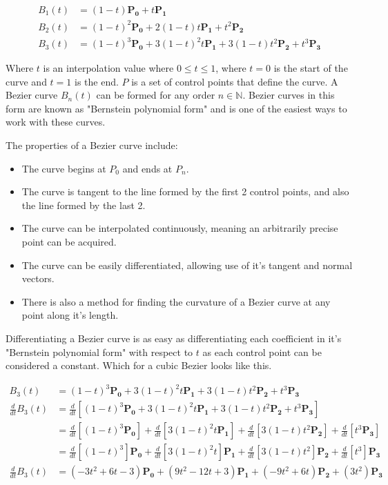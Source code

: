         \begin{align*}
            B_1(t) &= (1 - t)\mathbf{P_0} + t\mathbf{P_1}\\
            B_2(t) &= (1 - t)^2\mathbf{P_0} + 2(1 - t)t\mathbf{P_1} + t^2\mathbf{P_2}\\
            B_3(t) &= (1 - t)^3\mathbf{P_0} + 3(1 - t)^2t\mathbf{P_1} + 3(1 - t)t^2\mathbf{P_2} + t^3\mathbf{P_3}
        \end{align*}

        Where $t$ is an interpolation value where $0 \leq t \leq 1$, where $t=0$ is the start of the curve and $t=1$ is the end. $P$ is a set of control points that define the curve. A Bezier curve $B_n(t)$ can be formed for any order $n \in \mathbb{N}$. Bezier curves in this form are known as "Bernstein polynomial form" and is one of the easiest ways to work with these curves.

        The properties of a Bezier curve include:
        \begin{itemize}
            \item The curve begins at $P_0$ and ends at $P_n$.
            \item The curve is tangent to the line formed by the first 2 control points, and also the line formed by the last 2.
            \item The curve can be interpolated continuously, meaning an arbitrarily precise point can be acquired.
            \item The curve can be easily differentiated, allowing use of it's tangent and normal vectors.
            \item There is also a method for finding the curvature of a Bezier curve at any point along it's length.
        \end{itemize}

        Differentiating a Bezier curve is as easy as differentiating each coefficient in it's "Bernstein polynomial form" with respect to $t$ as each control point can be considered a constant. Which for a cubic Bezier looks like this.

        \begin{align*}
            B_3(t) &= (1 - t)^3\mathbf{P_0} + 3(1 - t)^2t\mathbf{P_1} + 3(1 - t)t^2\mathbf{P_2} + t^3\mathbf{P_3}\\
            \frac{d}{dt}B_3(t) &= \frac{d}{dt}\left[(1 - t)^3\mathbf{P_0} + 3(1 - t)^2t\mathbf{P_1} + 3(1 - t)t^2\mathbf{P_2} + t^3\mathbf{P_3}\right]\\
            &= \frac{d}{dt}\left[(1 - t)^3\mathbf{P_0}\right] + \frac{d}{dt}\left[3(1 - t)^2t\mathbf{P_1}\right] + \frac{d}{dt}\left[3(1 - t)t^2\mathbf{P_2}\right] + \frac{d}{dt}\left[t^3\mathbf{P_3}\right]\\
            &= \frac{d}{dt}\left[(1 - t)^3\right]\mathbf{P_0} + \frac{d}{dt}\left[3(1 - t)^2t\right]\mathbf{P_1} + \frac{d}{dt}\left[3(1 - t)t^2\right]\mathbf{P_2} + \frac{d}{dt}\left[t^3\right]\mathbf{P_3}\\
            \frac{d}{dt}B_3(t) &= (-3t^2 + 6t - 3)\mathbf{P_0} + (9t^2 - 12t + 3)\mathbf{P_1} + (-9t^2 + 6t)\mathbf{P_2} + (3t^2)\mathbf{P_3}
        \end{align*}

